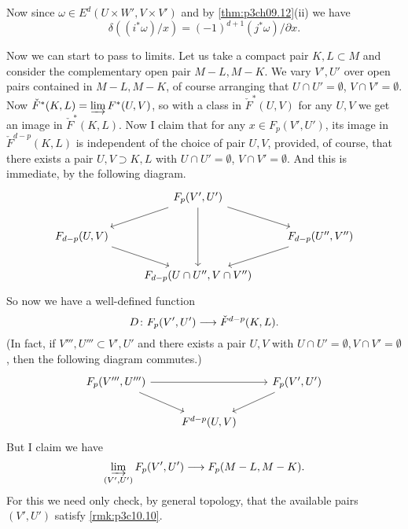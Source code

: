 \documentclass[../main]{subfiles}
\begin{document}
Now since $\omega \in E^d(U \times W',V \times V')$ and by \ref{thm:p3ch09.12}(ii) we have
\[\delta((i^* \omega)/x) = (-1)^{d+1}(j^* \omega)/\partial x.\]

Now we can start to pass to limits. Let us take a compact pair $K,L \subset M$ and consider the complementary open pair $M-L,M-K$. We vary $V',U'$ over open pairs contained in $M-L,M-K$, of course arranging that $U \cap U' = \emptyset$, $V \cap V' = \emptyset$. Now $\check{F}^*(K,L) = \varinjlim F^*(U,V)$, so with a class in $\check{F}^*(U,V)$ for any $U,V$ we get an image in $\check{F}^*(K,L)$. Now I claim that for any $x \in F_p(V',U')$, its image in $\check{F}^{d-p}(K,L)$ is independent of the choice of pair $U,V$, provided, of course, that there exists a pair $U,V \supset K,L$ with $U \cap U' = \emptyset$, $V \cap V' = \emptyset$. And this is immediate, by the following diagram.
\[
\begin{tikzcd}
                             & {F_p(V', U')} \arrow[dd] \arrow[rd] \arrow[ld] &                                  \\
{F_{d - p}(U, V)} \arrow[rd] &                                                & {F_{d - p}(U'', V'')} \arrow[ld] \\
                             & {F_{d - p}(U \cap U'', V \cap V'')}            &                                 
\end{tikzcd}
\]
So now we have a well-defined function 
\[D \colon F_p(V',U') \longrightarrow \check{F}^{d-p}(K,L).\]
(In fact, if $V''',U''' \subset V',U'$ and there exists a pair $U,V$ with $U \cap U' = \emptyset, V \cap V' = \emptyset$, then the following diagram commutes.)
\[
\begin{tikzcd}
{F_p(V''', U''')} \arrow[rr] \arrow[rd] &                   & {F_p(V', U')} \arrow[ld] \\
                                        & {F^{d - p}(U, V)} &                         
\end{tikzcd}
\]
But I claim we have
\[\varinjlim_{(V',U')} F_p(V',U') \longrightarrow F_p(M-L,M-K).\]
For this we need only check, by general topology, that the available pairs $(V',U')$ satisfy \ref{rmk:p3c10.10}.
\end{document}
